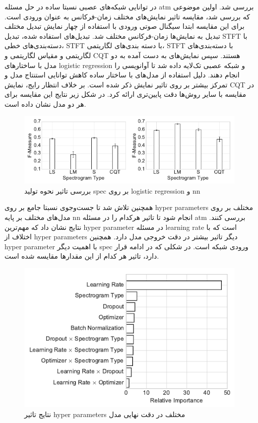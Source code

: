 در \cite{kelz2016potential} توانایی شبکه‌های عصبی نسبتا ساده در حل مسئله
\gls{atm} بررسی شد. اولین موضوعی که بررسی شد، مقایسه تاثیر نمایش‌های مختلف
زمان-فرکانس به عنوان ورودی است. برای این مقایسه ابتدا سیگنال صوتی ورودی با
استفاده از چهار نمایش تبدیل مختلف تبدیل به نمایش‌ها زمان-فرکانس مختلف شد.
تبدیل‌های استفاده شده، تبدیل \gls{STFT} با دسته‌بندی‌های خطی، \gls{STFT} با دسته
بندی‌های لگاریتمی، \gls{STFT} با دسته‌بندی‌های لگاریتمی و مقیاس لگاریتمی و
\gls{CQT} هستند. سپس نمایش‌های به دست آمده به دو مدل با ساختارهای \gls{logistic
regression} و شبکه عصبی تک‌لایه داده شد تا آوانویسی را انجام دهند. دلیل استفاده
از مدل‌های با ساختار ساده کاهش توانایی استنتاج مدل و تمرکز بیشتر بر روی تاثیر
نمایش ذکر شده است. بر خلاف انتظار رایج، نمایش \gls{CQT} در مقایسه با سایر روش‌ها
دقت پایین‌تری ارائه کرد. در شکل زیر نتایج این مقایسه برای هر دو مدل نشان داده است.
\begin{figure}[ht]
    \centering
    \includegraphics[width=12cm]{./statics/kelz2016potential_spec.png}
    \caption{بررسی تاثیر نحوه تولید \gls{spec} بر روی \gls{logistic regression} و \gls{nn}}
\end{figure}

همچنین تلاش شد تا جست‌وجوی نسبتا جامع بر روی \glspl{hyper parameter} مختلف بر
روی مدل‌های مختلف بر پایه \gls{nn} انجام شود تا تاثیر هرکدام را در مسئله
\gls{atm} بررسی کنند. نتایج نشان داد که مهم‌ترین \gls{hyper parameter} در مسئله
\gls{learning rate} است که با اختلاف از \glspl{hyper parameter} دیگر تاثیر بیشتر
در دقت خروجی مدل دارد. همچنین \gls{hyper parameter} با اهمیت دیگر \gls{spec}
ورودی شبکه است. در شکلی که در ادامه قرار دارد، تاثیر هر کدام از این مقدارها
مقایسه شده است.
\begin{figure}[ht]
    \centering
    \includegraphics[width=12cm]{./statics/kelz2016potential_hp.png}
    \caption{نتایج تاثیر \glspl{hyper parameter} مختلف در دقت نهایی مدل}
\end{figure}

